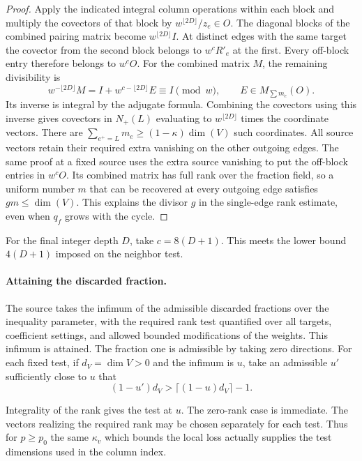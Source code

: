 \begin{proof}
Apply the indicated integral column operations within
each block and multiply the covectors of that block by
\(w^{\lfloor 2D\rfloor}/z_e\in O\). The diagonal blocks of the
combined pairing matrix become \(w^{\lfloor 2D\rfloor} I\).
At distinct edges with the same target
the covector from the second block belongs to \(w^cR'_e\) at
the first. Every off-block entry therefore belongs to \(w^c O\).
For the combined matrix \(M\), the remaining divisibility is
\[
 w^{-\lfloor2D\rfloor}M=I+w^{c-\lfloor2D\rfloor}E\equiv I\pmod w,\qquad E\in M_{\sum m_e}(O).
\]
Its inverse is integral by the adjugate formula.
Combining the covectors using this inverse gives covectors in
\(N_+(L)\) evaluating to \(w^{\lfloor 2D\rfloor}\) times the coordinate vectors.
There are \(\sum_{e^+=L}m_e\ge(1-\kappa)\dim(V)\) such
coordinates. All source vectors retain their required extra
vanishing on the other outgoing edges. 
The same proof at a fixed source uses the extra source vanishing to put the
off-block entries in \(w^cO\). Its combined matrix has full
rank over the fraction field, so a uniform number \(m\) that
can be recovered at every outgoing edge satisfies
\(gm\le\dim(V)\). This explains the divisor \(g\) in the
single-edge rank estimate, even when \(q_f\) grows with the
cycle.

\end{proof}

For the final integer depth \(D\), take \(c=8(D+1)\). This meets
the lower bound \(4(D+1)\) imposed on the neighbor test.

\paragraph{Attaining the discarded fraction.}
The source takes the infimum of the admissible discarded
fractions over the inequality parameter, with the required
rank test quantified over all targets, coefficient settings,
and allowed bounded modifications of the weights. This infimum
is attained. The fraction one is admissible by taking zero
directions. For each fixed test, if \(d_V=\dim V>0\) and the
infimum is \(u\), take an admissible \(u'\) sufficiently close
to \(u\) that
\[
 (1-u')d_V>\lceil(1-u)d_V\rceil-1.
\]

Integrality of the rank gives the test at \(u\). The zero-rank
case is immediate. The vectors realizing the required rank may be chosen separately for each test. Thus for \(p\ge p_0\) the same \(\kappa_v\) which bounds the local loss actually supplies the test dimensions used in the column index.





